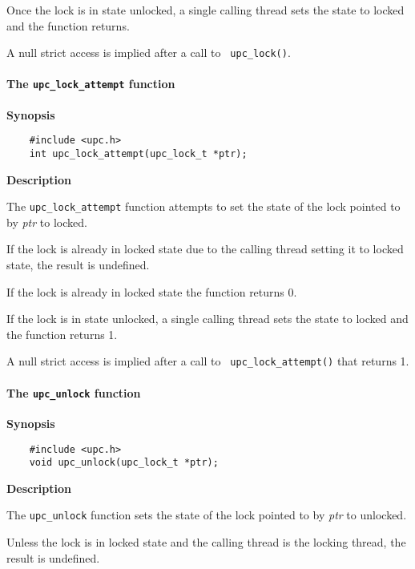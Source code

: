 \np Once the lock is in state unlocked, a single calling thread
    sets the state to locked and the function returns.

\np A null strict access is implied after a call to {\tt
    upc\_lock()}.

\paragraph{The {\tt upc\_lock\_attempt} function}

{\bf Synopsis} 

\npf\vspace{-2.5em}
\begin{verbatim}
    #include <upc.h> 
    int upc_lock_attempt(upc_lock_t *ptr); 
\end{verbatim}

{\bf Description}

\np The {\tt upc\_lock\_attempt} function attempts to set the state of
   the lock pointed to by {\em ptr} to locked.

\np If the lock is already in locked state due to the calling thread setting it
    to locked state, the result is undefined.

\np If the lock is already in locked state the function returns 0.
    
\np If the lock is in state unlocked, a single calling thread
    sets the state to locked and the function returns 1.

\np A null strict access is implied after a call to {\tt
    upc\_lock\_attempt()} that returns 1.

\paragraph{The {\tt upc\_unlock} function}

{\bf Synopsis} 

\npf\vspace{-2.5em}
\begin{verbatim}
    #include <upc.h> 
    void upc_unlock(upc_lock_t *ptr); 
\end{verbatim}

{\bf Description}

\np The {\tt upc\_unlock} function sets the state of
   the lock pointed to by {\em ptr} to unlocked.

\np Unless the lock is in locked state and the calling
    thread is the locking thread, the result is undefined.

